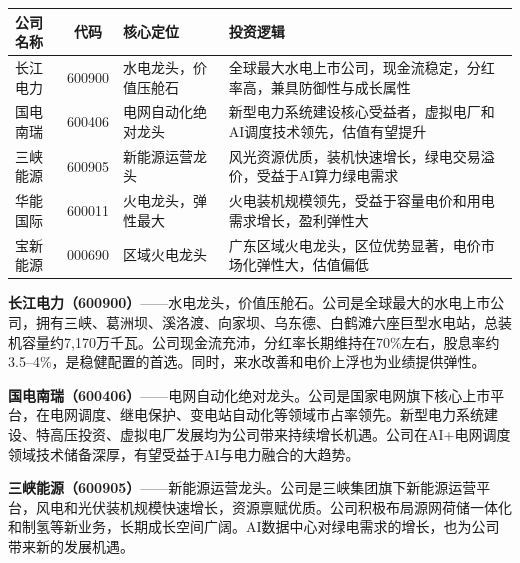 \begin{exhibitbox}[表4-4：电力公用事业核心标的一览]
\centering
\small
\setlength{\aboverulesep}{2pt}
\setlength{\belowrulesep}{0pt}
\begin{tabularx}{\linewidth}{L{2.8cm} c l >{\raggedright\arraybackslash}X}
\toprule
\textbf{公司名称} & \textbf{代码} & \textbf{核心定位} & \textbf{投资逻辑} \\
\midrule
{}
长江电力 & 600900 & 水电龙头，价值压舱石 & 全球最大水电上市公司，现金流稳定，分红率高，兼具防御性与成长属性 \\
国电南瑞 & 600406 & 电网自动化绝对龙头 & 新型电力系统建设核心受益者，虚拟电厂和AI调度技术领先，估值有望提升 \\
三峡能源 & 600905 & 新能源运营龙头 & 风光资源优质，装机快速增长，绿电交易溢价，受益于AI算力绿电需求 \\
华能国际 & 600011 & 火电龙头，弹性最大 & 火电装机规模领先，受益于容量电价和用电需求增长，盈利弹性大 \\
宝新能源 & 000690 & 区域火电龙头 & 广东区域火电龙头，区位优势显著，电价市场化弹性大，估值偏低 \\
\bottomrule
\end{tabularx}
\end{exhibitbox}

\textbf{长江电力（600900）}——水电龙头，价值压舱石。公司是全球最大的水电上市公司，拥有三峡、葛洲坝、溪洛渡、向家坝、乌东德、白鹤滩六座巨型水电站，总装机容量约7,170万千瓦。公司现金流充沛，分红率长期维持在70\%左右，股息率约3.5--4\%，是稳健配置的首选。同时，来水改善和电价上浮也为业绩提供弹性。

\vspace{0.2em}

\textbf{国电南瑞（600406）}——电网自动化绝对龙头。公司是国家电网旗下核心上市平台，在电网调度、继电保护、变电站自动化等领域市占率领先。新型电力系统建设、特高压投资、虚拟电厂发展均为公司带来持续增长机遇。公司在AI+电网调度领域技术储备深厚，有望受益于AI与电力融合的大趋势。

\vspace{0.2em}

\textbf{三峡能源（600905）}——新能源运营龙头。公司是三峡集团旗下新能源运营平台，风电和光伏装机规模快速增长，资源禀赋优质。公司积极布局源网荷储一体化和制氢等新业务，长期成长空间广阔。AI数据中心对绿电需求的增长，也为公司带来新的发展机遇。

\vspace{0.2em}

